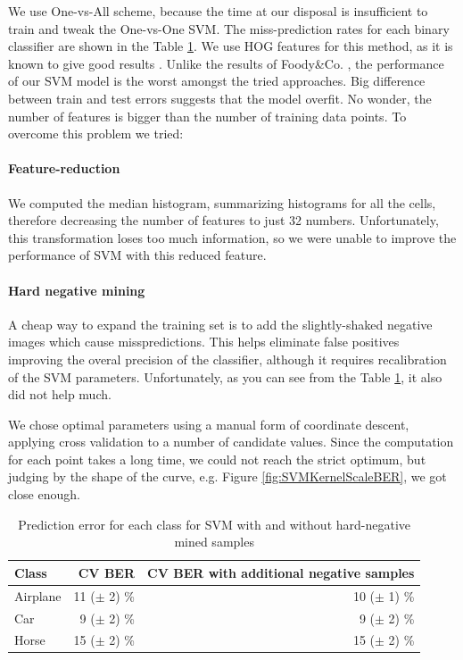 \documentclass{article} %
\begin{document}
We use One-vs-All scheme, because the time at our disposal is insufficient to train and tweak the One-vs-One SVM. The miss-prediction rates for each binary classifier are shown in the Table \ref{tbl:SVMerr}. We use HOG features for this method, as it is known to give good results \cite{zhang2010pedestrian}. Unlike the results of Foody\&Co. \cite{foody2004relative}, the performance of our SVM model is the worst amongst the tried approaches. Big difference between train and test errors suggests that the model overfit. No wonder, the number of features is bigger than the number of training data points. To overcome this problem we tried:

\paragraph{Feature-reduction} We computed the median histogram, summarizing histograms for all the cells, therefore decreasing the number of features to just 32 numbers. Unfortunately, this transformation loses too much information, so we were unable to improve the performance of SVM with this reduced feature.

\paragraph{Hard negative mining} A cheap way to expand the training set is to add the slightly-shaked negative images which cause misspredictions. This helps eliminate false positives improving the overal precision of the classifier, although it requires recalibration of the SVM parameters. Unfortunately, as you can see from the Table \ref{tbl:SVMerr}, it also did not help much.

We chose optimal parameters using a manual form of coordinate descent, applying cross validation to a number of candidate values. Since the computation for each point takes a long time, we could not reach the strict optimum, but judging by the shape of the curve, e.g. Figure \ref{fig:SVMKernelScaleBER}, we got close enough.

\begin{table}
  \centering
  \begin{tabular}{|l|r|r|}
    \hline
    Class & CV BER & CV BER with additional negative samples \\ \hline
    Airplane & 11 ($\pm$ 2) \% & 10 ($\pm$ 1) \% \\
    Car & 9 ($\pm$ 2) \% & 9 ($\pm$ 2) \% \\
    Horse & 15 ($\pm$ 2) \% & 15 ($\pm$ 2) \% \\
    \hline
  \end{tabular}
  \caption{Prediction error for each class for SVM with and without hard-negative mined samples}
  \label{tbl:SVMerr}
\end{table}
\end{document}
